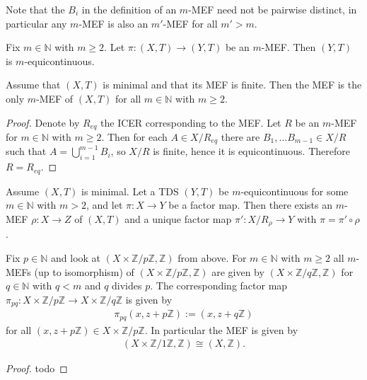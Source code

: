 \begin{remark}
	Note that the $B_i$ in the definition of an $m$-MEF need not be pairwise distinct, in particular any $m$-MEF is also an $m'$-MEF for all $m' > m$.
\end{remark}

\begin{proposition}
	Fix $m \in \mathbb{N}$ with $m \geq 2$. Let $\pi : (X,T) \to (Y, T)$ be an $m$-MEF. Then $(Y, T)$ is $m$-equicontinuous.
\end{proposition}

\begin{proposition}
	Assume that $(X, T)$ is minimal and that its MEF is finite. Then the MEF is the only $m$-MEF of $(X, T)$ for all $m \in \mathbb{N}$ with $m \geq 2$.
\end{proposition}
\begin{proof}
	Denote by $R_{eq}$ the ICER corresponding to the MEF. Let $R$ be an $m$-MEF for $m \in \mathbb{N}$ with $m \geq 2$. Then for each $A \in X/R_{eq}$ there are $B_1, \dots B_{m-1} \in X/R$ such that $A = \bigcup_{i=1}^{m-1} B_i$, so $X/R$ is finite, hence it is equicontinuous. Therefore $R = R_{eq}$.
\end{proof}

\begin{theorem}
	Assume $(X, T)$ is minimal. Let a TDS $(Y, T)$ be $m$-equicontinuous for some $m \in \mathbb{N}$ with $m > 2$, and let $\pi: X \to Y$ be a factor map. Then there exists an $m$-MEF $\rho: X \to Z$ of $(X, T)$ and a unique factor map $\pi': X/R_\rho \to Y$ with $\pi = \pi' \circ \rho$.
\end{theorem}

\begin{example}
	Fix $p \in \mathbb{N}$ and look at $(X \times \mathbb{Z}/p\mathbb{Z}, \mathbb{Z})$ from above. For $m \in \mathbb{N}$ with $m \geq 2$ all $m$-MEFs (up to isomorphism) of $(X \times \mathbb{Z}/p\mathbb{Z}, \mathbb{Z})$ are given by $(X \times \mathbb{Z}/q\mathbb{Z}, \mathbb{Z})$ for $q \in \mathbb{N}$ with $q < m$ and $q$ divides $p$. The corresponding factor map $\pi_{pq}: X \times \mathbb{Z}/p\mathbb{Z} \to X \times \mathbb{Z}/q\mathbb{Z}$ is given by
	\begin{align*}
		\pi_{pq}(x, z + p\mathbb{Z}) := (x, z + q\mathbb{Z})
	\end{align*}
	for all $(x, z + p\mathbb{Z}) \in X \times \mathbb{Z}/p\mathbb{Z}$. In particular the MEF is given by
	\begin{align*}
		(X \times \mathbb{Z}/1\mathbb{Z}, \mathbb{Z}) \cong (X, \mathbb{Z}).
	\end{align*}
\end{example}
\begin{proof}
	todo
\end{proof}
